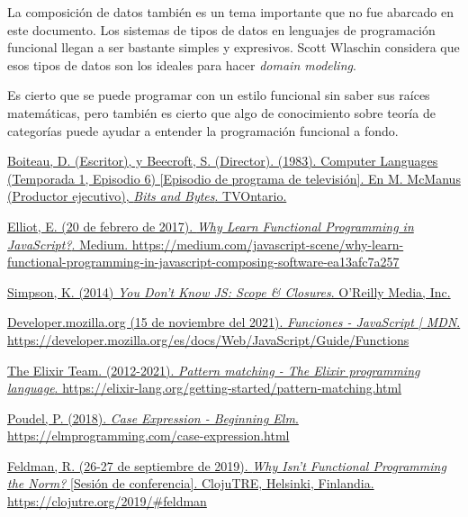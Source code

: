 \documentclass{article}
\begin{document}
La composición de datos también es un tema importante que no fue abarcado en este documento. Los sistemas de tipos de datos en lenguajes de programación funcional llegan a ser bastante simples y expresivos. Scott Wlaschin considera que esos tipos de datos son los ideales para hacer \textit{domain modeling}\cite{domain-modeling-fp}.

Es cierto que se puede programar con un estilo funcional sin saber sus raíces matemáticas, pero también es cierto que algo de conocimiento sobre teoría de categorías puede ayudar a entender la programación funcional a fondo.


\pagebreak
\begin{thebibliography}{99}
 \href{https://youtu.be/_C5AHaS1mOA}{Boiteau, D. (Escritor), y Beecroft, S. (Director). (1983). Computer Languages (Temporada 1, Episodio 6) [Episodio de programa de televisión]. En M. McManus (Productor ejecutivo), \textit{Bits and Bytes}. TVOntario.}

 \href{https://medium.com/javascript-scene/why-learn-functional-programming-in-javascript-composing-software-ea13afc7a257}{Elliot, E. (20 de febrero de 2017). \textit{Why Learn Functional Programming in JavaScript?}. Medium. https://medium.com/javascript-scene/why-learn-functional-programming-in-javascript-composing-software-ea13afc7a257}

 \href{https://github.com/getify/You-Dont-Know-JS/blob/1st-ed/scope\%20\&\%20closures/README.md\#you-dont-know-js-scope--closures}{Simpson, K. (2014) \textit{You Don't Know JS: Scope \& Closures}. O'Reilly Media, Inc.}

 \href{https://developer.mozilla.org/es/docs/Web/JavaScript/Guide/Functions}{Developer.mozilla.org (15 de noviembre del 2021). \textit{Funciones - JavaScript | MDN}. https://developer.mozilla.org/es/docs/Web/JavaScript/Guide/Functions}

 \href{https://elixir-lang.org/getting-started/pattern-matching.html}{The Elixir Team. (2012-2021). \textit{Pattern matching - The Elixir programming language}. https://elixir-lang.org/getting-started/pattern-matching.html}

 \href{https://elmprogramming.com/case-expression.html}{Poudel, P. (2018). \textit{Case Expression - Beginning Elm}. https://elmprogramming.com/case-expression.html}

 \href{https://clojutre.org/2019/#feldman}{Feldman, R. (26-27 de septiembre de 2019). \textit{Why Isn't Functional Programming the Norm?} [Sesión de conferencia]. ClojuTRE, Helsinki, Finlandia. https://clojutre.org/2019/\#feldman}


\end{thebibliography}
\end{document}
